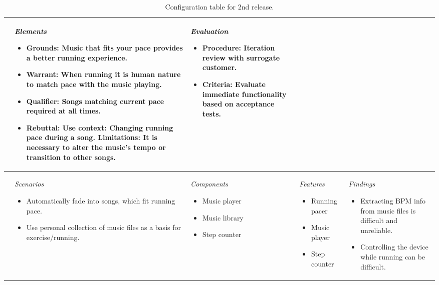 \begin{table}
\begin{tabular}{|l|l|l|l|l|}
{	}
	& \parbox[t][][c]{0.20\textwidth}{
		\textit{Elements}
		\begin{itemize}[leftmargin=*] 
		\item Grounds: 
		Music that fits your pace provides a better running experience. 
		\item Warrant: 
		When running it is human nature to match pace with the music playing. 
		\item Qualifier:
		Songs matching current pace required at all times.
		\item Rebuttal: \newline
		Use context: \newline
		Changing running pace during a song. \newline 
		Limitations: 
		It is necessary to alter the music's tempo or transition to other songs.
		\end{itemize}
	}
	& \parbox[t][][c]{0.20\textwidth}{ 
		\textit{Evaluation}
		\begin{itemize}[leftmargin=*]
		\item Procedure:  Iteration review with surrogate customer.
		\item Criteria:  Evaluate immediate functionality based on acceptance tests.
		\end{itemize}		
	}\\ \hline
\parbox[t][3.5cm][c]{0.02\textwidth}{}
	& \parbox[t][][c]{0.20\textwidth}{ 
		\textit{Scenarios}
		\begin{itemize}[leftmargin=*]
		\item Automatically fade into songs, which fit running pace.
		\item Use personal collection of music files as a basis for exercise/running.
		\end{itemize}
	}
	& \parbox[t][][c]{0.20\textwidth}{ 
		\textit{Components}
		\begin{itemize}[leftmargin=*]
		\item Music player
		\item Music library
		\item Step counter
		\end{itemize}
	}
	& \parbox[t][][c]{0.20\textwidth}{ 
		\textit{Features}
		\begin{itemize}[leftmargin=*]
		\item Running pacer
		\item Music player
		\item Step counter
		\end{itemize}
	}
	& \parbox[t][][c]{0.20\textwidth}{ 
		\textit{Findings} 
		\begin{itemize}[leftmargin=*]
		\item Extracting BPM info from music files is difficult and unreliable. 
		\item Controlling the device while running can be difficult.
		\end{itemize}
	}\\ \hline     
\end{tabular}
\caption[Table caption text]{Configuration table for 2nd release.}
\label{table:config1}
\end{table}